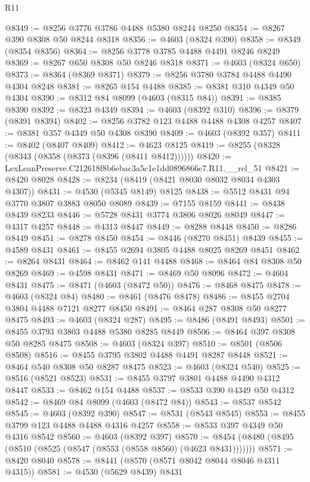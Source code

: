 \begin{lexlean}{R11}
\begin{coremodule}
@8349 := @8256 @3776 @3786 @4488 @5380 @8244 @8250
@8354 := @8267 @390 @8308 @50 @8244 @8318
@8356 := @4603 (@8324 @390)
@8358 := @8349 (@8354 @8356)
@8364 := @8256 @3778 @3785 @4488 @4491 @8246 @8249
@8369 := @8267 @650 @8308 @50 @8246 @8318
@8371 := @4603 (@8324 @650)
@8373 := @8364 (@8369 @8371)
@8379 := @8256 @3780 @3784 @4488 @4490 @4304 @8248
@8381 := @8265 @154 @4488
@8385 := @8381 @310 @4349 @50 @4304
@8390 := @8312 @84 @8099 (@4603 (@8315 @84))
@8391 := @8385 @8390
@8392 := @8323 @4349
@8394 := @4603 (@8392 @310)
@8396 := @8379 (@8391 @8394)
@8402 := @8256 @3782 @123 @4488 @4488 @4308 @4257
@8407 := @8381 @357 @4349 @50 @4308 @8390
@8409 := @4603 (@8392 @357)
@8411 := @8402 (@8407 @8409)
@8412 := @4623 @8125
@8419 := @8255 (@8328 (@8343 (@8358 (@8373 (@8396 (@8411 @8412))))))
@8420 := LexLeanPreserve.C212618f8b6ebac3a5c1e1dd0896866e7.R11.__rel_51
@8421 := @8420 @8028
@8428 := @8234 (@8419 (@8421 @8030 @8032 @8034 @4303 @4307))
@8431 := @4530 (@5345 @8149) @8125
@8438 := @5512 @8431 @94 @3770 @3807 @3883 @8050 @8089
@8439 := @7155 @8159
@8441 := @8438 @8439 @8233
@8446 := @5728 @8431 @3774 @3806 @8026 @8049
@8447 := @4317 @4257
@8448 := @4313 @8447
@8449 := @8288 @8448
@8450 := @8286 @8449
@8451 := @8278 @8450
@8454 := @8446 (@8270 @8451) @8439
@8455 := @4589 @8431
@8461 := @8455 @2694 @3805 @4488 @8025 @8269 @8451
@8462 := @8264 @8431
@8464 := @8462 @141 @4488
@8468 := @8464 @84 @8308 @50 @8269
@8469 := @4598 @8431
@8471 := @8469 @50 @8096
@8472 := @4604 @8431
@8475 := @8471 (@4603 (@8472 @50))
@8476 := @8468 @8475
@8478 := @4603 (@8324 @84)
@8480 := @8461 (@8476 @8478)
@8486 := @8455 @2704 @3804 @4488 @7121 @8277 @8450
@8491 := @8464 @287 @8308 @50 @8277 @8475
@8493 := @4603 (@8324 @287)
@8495 := @8486 (@8491 @8493)
@8501 := @8455 @3793 @3803 @4488 @5380 @8285 @8449
@8506 := @8464 @397 @8308 @50 @8285 @8475
@8508 := @4603 (@8324 @397)
@8510 := @8501 (@8506 @8508)
@8516 := @8455 @3795 @3802 @4488 @4491 @8287 @8448
@8521 := @8464 @540 @8308 @50 @8287 @8475
@8523 := @4603 (@8324 @540)
@8525 := @8516 (@8521 @8523)
@8531 := @8455 @3797 @3801 @4488 @4490 @4312 @8447
@8533 := @8462 @154 @4488
@8537 := @8533 @390 @4349 @50 @4312
@8542 := @8469 @84 @8099 (@4603 (@8472 @84))
@8543 := @8537 @8542
@8545 := @4603 (@8392 @390)
@8547 := @8531 (@8543 @8545)
@8553 := @8455 @3799 @123 @4488 @4488 @4316 @4257
@8558 := @8533 @397 @4349 @50 @4316 @8542
@8560 := @4603 (@8392 @397)
@8570 := @8454 (@8480 (@8495 (@8510 (@8525 (@8547 (@8553 (@8558 @8560) (@4623 @8431)))))))
@8571 := @8420 @8040
@8578 := @8441 (@8570 (@8571 @8042 @8044 @8046 @4311 @4315))
@8581 := @4530 (@5629 @8439) @8431

\end{coremodule}
\end{lexlean}

